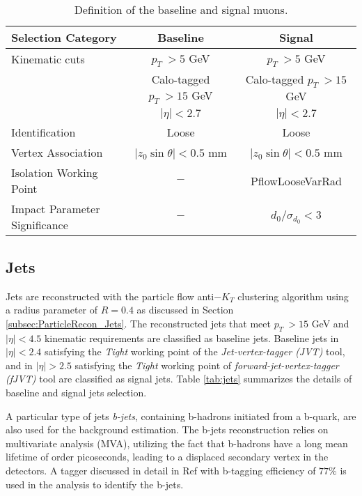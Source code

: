 \begin{table}[ht]
    \centering
        \caption{Definition of the baseline and signal muons.\label{tab:muon_baseline_signal}}
        \begin{tabular}{|| l || c | c ||}
        \hline
        Selection Category & \textbf{Baseline} & \textbf{Signal} \\
        \hline\hline
        Kinematic cuts & $p_{T}~ > 5$ GeV & $p_{T}~ > 5$ GeV \\
                    & Calo-tagged $ p_{T}~ > 15$ GeV & Calo-tagged $ p_{T}~ > 15$ GeV \\
              & $|\eta| < 2.7$ & $|\eta| < 2.7$\\
        \hline
        Identification & Loose & Loose \\
        \hline 
        Vertex Association & $|z_{0}\sin\theta| < 0.5$ mm & $|z_{0}\sin\theta|< 0.5$ mm\\
        \hline
        Isolation Working Point & $-$ & PflowLooseVarRad\\
        \hline 
        Impact Parameter Significance & $-$ & $d_{0}/\sigma_{d_{0}} < 3$ \\
        \hline
    \end{tabular}
\end{table}

\subsection{Jets}
\label{subsec:JetRecon}
Jets are reconstructed with the particle flow anti$-K_{T}$ clustering algorithm using a radius parameter of $R = 0.4$ as discussed in Section \ref{subsec:ParticleRecon_Jets}. The reconstructed jets that meet $p_{T}~ > 15$ GeV and $ |\eta| < 4.5 $ kinematic requirements are classified as baseline jets. Baseline jets in $ |\eta| < 2.4 $ satisfying the \textit{Tight} working point of the \textit{Jet-vertex-tagger (JVT)} tool, and in $ |\eta| > 2.5 $ satisfying the \textit{Tight} working point of \textit{forward-jet-vertex-tagger (fJVT)} tool are classified as signal jets. Table \ref{tab:jets} summarizes the details of baseline and signal jets selection. 

A particular type of jets \textit{b-jets}, containing b-hadrons initiated from a b-quark, are also used for the background estimation. The b-jets reconstruction relies on multivariate analysis (MVA), utilizing the fact that b-hadrons have a long mean lifetime of order picoseconds, leading to a displaced secondary vertex in the detectors. A tagger discussed in detail in Ref \cite{bTagging} with b-tagging efficiency of $77\%$ is used in the analysis to identify the b-jets.

